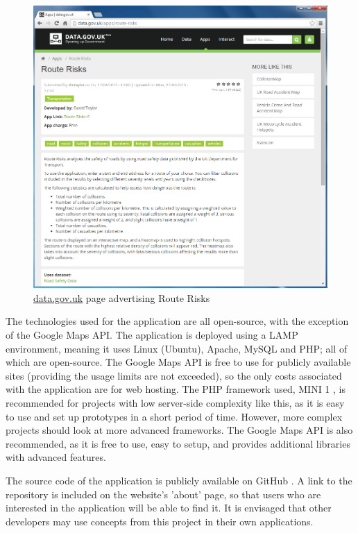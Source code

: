 \documentclass[authoryearcitations]{UoYCSproject}
\begin{document}
\begin{figure}
	\center
	\includegraphics[scale=0.4]{datagovuk}
	\caption{\url{data.gov.uk} page advertising Route Risks}
	\label{fig:datagovuk}
\end{figure}

The technologies used for the application are all open-source, with the exception of the Google Maps API. The application is deployed using a LAMP environment, meaning it uses Linux (Ubuntu), Apache, MySQL and PHP; all of which are open-source. The Google Maps API is free to use for publicly available sites (providing the usage limits are not exceeded), so the only costs associated with the application are for web hosting. The PHP framework used, MINI 1 \citep{mini}, is recommended for projects with low server-side complexity like this, as it is easy to use and set up prototypes in a short period of time. However, more complex projects should look at more advanced frameworks. The Google Maps API is also recommended, as it is free to use, easy to setup, and provides additional libraries with advanced features.

The source code of the application is publicly available on GitHub \citep{Taylor2015}. A link to the repository is included on the website's 'about' page, so that users who are interested in the application will be able to find it. It is envisaged that other developers may use concepts from this project in their own applications.
\end{document}
